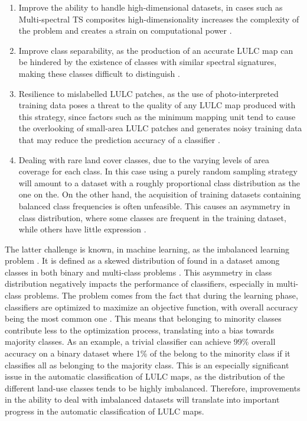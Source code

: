 \documentclass[remotesensing,article,submit,moreauthors,pdftex]{Definitions/mdpi}
\begin{document}
\begin{enumerate}
    \item Improve the ability to handle high-dimensional datasets, in cases
        such as Multi-spectral TS composites high-dimensionality increases the
        complexity of the problem and creates a strain on computational power
        \cite{Stromann2020}.
    \item Improve class separability, as the production of an accurate LULC map
        can be hindered by the existence of classes with similar spectral
        signatures, making these classes difficult to distinguish
        \cite{Alonso-Sarria2019}.
    \item Resilience to mislabelled LULC patches, as the use of
        photo-interpreted training data poses a threat to the quality of any
        LULC map produced with this strategy, since factors such as the minimum
        mapping unit tend to cause the overlooking of small-area LULC patches
        and generates noisy training data that may reduce the prediction
        accuracy of a classifier \cite{Pelletier2017}.
    \item Dealing with rare land cover classes, due to the varying levels of
        area coverage for each class. In this case using a purely random
        sampling strategy will amount to a dataset with a roughly proportional
        class distribution as the one on the. On the other hand, the acquisition of training
        datasets containing balanced class frequencies is often unfeasible.
        This causes an asymmetry in class distribution, where some classes are
        frequent in the training dataset, while others have little expression
        \cite{Wang2019, Feng2019}.
\end{enumerate}

The latter challenge is known, in machine learning, as the imbalanced learning
problem \cite{Chawla2004}. It is defined as a skewed distribution of found in a dataset among classes in both binary and
multi-class problems \cite{Abdi2016}. This asymmetry in class distribution
negatively impacts the performance of classifiers, especially in multi-class
problems.  The problem comes from the fact that during the learning phase,
classifiers are optimized to maximize an objective function, with overall
accuracy being the most common one \cite{Maxwell2018}. This means
that belonging to minority classes
contribute less to the optimization process, translating into a bias towards
majority classes. As an example, a trivial classifier can achieve 99\%
overall accuracy on a binary dataset where 1\% of the belong to the minority class if it classifies all as belonging to the majority class. This is an
especially significant issue in the automatic classification of LULC maps, as
the distribution of the different land-use classes tends to be highly
imbalanced.  Therefore, improvements in the ability to deal with imbalanced
datasets will translate into important progress in the automatic
classification of LULC maps.
\end{document}

